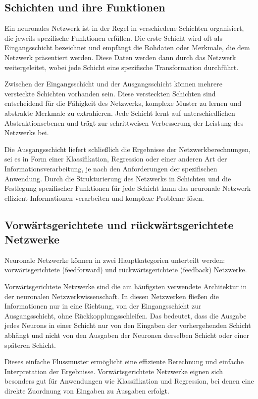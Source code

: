 \subsection{Schichten und ihre Funktionen}
\label{sec:Grundlagen_Schichten}
Ein neuronales Netzwerk ist in der Regel in verschiedene Schichten organisiert, die jeweils spezifische Funktionen erfüllen. Die erste Schicht wird oft als Eingangsschicht bezeichnet und empfängt die Rohdaten oder Merkmale, die dem Netzwerk präsentiert werden. Diese Daten werden dann durch das Netzwerk weitergeleitet, wobei jede Schicht eine spezifische Transformation durchführt.

Zwischen der Eingangsschicht und der Ausgangsschicht können mehrere versteckte Schichten vorhanden sein. Diese versteckten Schichten sind entscheidend für die Fähigkeit des Netzwerks, komplexe Muster zu lernen und abstrakte Merkmale zu extrahieren. Jede Schicht lernt auf unterschiedlichen Abstraktionsebenen und trägt zur schrittweisen Verbesserung der Leistung des Netzwerks bei.

Die Ausgangsschicht liefert schließlich die Ergebnisse der Netzwerkberechnungen, sei es in Form einer Klassifikation, Regression oder einer anderen Art der Informationsverarbeitung, je nach den Anforderungen der spezifischen Anwendung. Durch die Strukturierung des Netzwerks in Schichten und die Festlegung spezifischer Funktionen für jede Schicht kann das neuronale Netzwerk effizient Informationen verarbeiten und komplexe Probleme lösen.

\subsection{Vorwärtsgerichtete und rückwärtsgerichtete Netzwerke}
\label{sec:Grundlagen_vorwarts_Netzwerke}
Neuronale Netzwerke können in zwei Hauptkategorien unterteilt werden: vorwärtsgerichtete (feedforward) und rückwärtsgerichtete (feedback) Netzwerke.

Vorwärtsgerichtete Netzwerke sind die am häufigsten verwendete Architektur in der neuronalen Netzwerkwissenschaft. In diesen Netzwerken fließen die Informationen nur in eine Richtung, von der Eingangsschicht zur Ausgangsschicht, ohne Rückkopplungsschleifen. Das bedeutet, dass die Ausgabe jedes Neurons in einer Schicht nur von den Eingaben der vorhergehenden Schicht abhängt und nicht von den Ausgaben der Neuronen derselben Schicht oder einer späteren Schicht.

Dieses einfache Flussmuster ermöglicht eine effiziente Berechnung und einfache Interpretation der Ergebnisse. Vorwärtsgerichtete Netzwerke eignen sich besonders gut für Anwendungen wie Klassifikation und Regression, bei denen eine direkte Zuordnung von Eingaben zu Ausgaben erfolgt.


